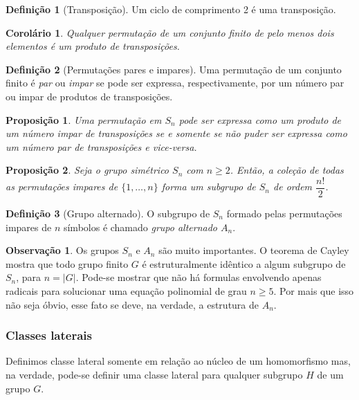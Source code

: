 \documentclass[a4paper,12pt]{report}
\theoremstyle{plain}
\newtheorem{proposicao}{Proposição}[section]
\newtheorem{corolario}{Corolário}[section]
\theoremstyle{definition}
\newtheorem{definicao}{Definição}[section]
\newtheorem{observacao}{Observação}[section]
\begin{document}
\begin{definicao}[Transposição]
	Um ciclo de comprimento 2 é uma transposição.
\end{definicao}

\begin{corolario}
	Qualquer permutação de um conjunto finito de pelo menos dois elementos é um produto de transposições.	
\end{corolario}

\begin{definicao}[Permutações pares e impares]
	Uma permutação de um conjunto finito é \emph{par} ou \emph{impar} se pode ser expressa, respectivamente, por um número par ou impar de produtos de transposições.
\end{definicao}

\begin{proposicao}
	Uma permutação em $S_n$ pode ser expressa como um produto de um número impar de transposições se e somente se não puder ser expressa como um número par de transposições e vice-versa.
\end{proposicao}

\begin{proposicao}
	Seja o grupo simétrico $S_n$ com $n\geq 2$. Então, a coleção de todas as permutações impares de $\{1,\dots,n\}$ forma um subgrupo de $S_n$ de ordem $\dfrac{n!}{2}$.	
\end{proposicao}

\begin{definicao}[Grupo alternado]
	O subgrupo de $S_n$ formado pelas permutações impares de $n$ símbolos é chamado \emph{grupo alternado $A_n$}.
\end{definicao}

\begin{observacao}
	Os grupos $S_n$ e $A_n$ são muito importantes. O teorema de Cayley mostra que todo grupo finito $G$ é estruturalmente idêntico a algum subgrupo de $S_n$, para $n = |G|$. Pode-se mostrar que não há formulas envolvendo apenas radicais para solucionar uma equação polinomial de grau $n\geq 5$. Por mais que isso não seja óbvio, esse fato se deve, na verdade, a estrutura de $A_n$.
\end{observacao}


\subsubsection{Classes laterais}

Definimos classe lateral somente em relação ao núcleo de um homomorfismo mas,
na verdade, pode-se definir uma classe lateral para qualquer subgrupo \(H\) de
um grupo \(G\).
\end{document}
